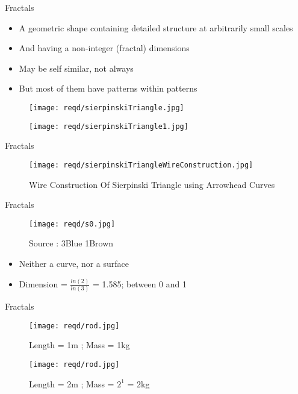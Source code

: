 \documentclass{beamer}
\begin{document}
\begin{frame}{Fractals}
	\begin{itemize}
		\item{\large A geometric shape containing detailed structure at arbitrarily small scales}
		\item{\large And having a non-integer (fractal) dimensions}
		\item{\large May be self similar, not always}
		\item{\large But most of them have patterns within patterns}
	\end{itemize}
	\pause
	\begin{figure}
		\centering
		\texttt{[image: reqd/sierpinskiTriangle.jpg]}
	\end{figure}
	\begin{figure}
		\centering
		\texttt{[image: reqd/sierpinskiTriangle1.jpg]}
	\end{figure}
\end{frame}

\begin{frame}{Fractals}
	\begin{figure}
		\centering
		\texttt{[image: reqd/sierpinskiTriangleWireConstruction.jpg]}
		\caption{Wire Construction Of Sierpinski Triangle using Arrowhead Curves}
	\end{figure}
\end{frame}

\begin{frame}{Fractals}
	\begin{figure}
		\centering
		\texttt{[image: reqd/s0.jpg]}
		\caption{Source : 3Blue 1Brown}
	\end{figure}
	\pause
	\begin{itemize}
		\item{Neither a curve, nor a surface}
		\item{Dimension = $\frac{ln(2)}{ln(3)}$ = 1.585; between 0 and 1}
	\end{itemize}
\end{frame}

\begin{frame}{Fractals}
	\begin{figure}
    		\centering
    		\texttt{[image: reqd/rod.jpg]}
        	\caption{Length = 1m ; Mass = 1kg}
	\end{figure}
	\pause
	\begin{figure}
    		\centering
    		\texttt{[image: reqd/rod.jpg]}
        	\caption{Length = 2m ; Mass = $2^1$ = 2kg}
	\end{figure}
\end{frame}
\end{document}
